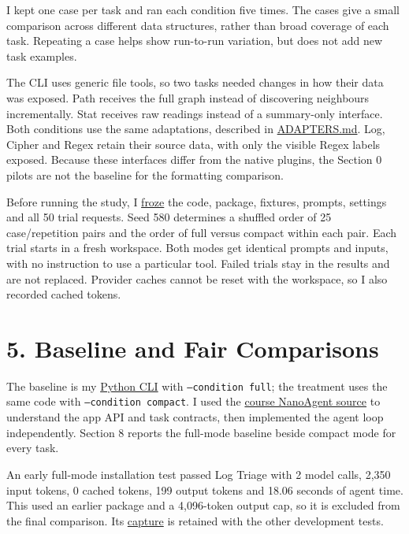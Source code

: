 \documentclass[10pt,letterpaper]{article}
\begin{document}
I kept one case per task and ran each condition five times. The cases give a small comparison across different data structures, rather than broad coverage of each task. Repeating a case helps show run-to-run variation, but does not add new task examples.

The CLI uses generic file tools, so two tasks needed changes in how their data was exposed. Path receives the full graph instead of discovering neighbours incrementally. Stat receives raw readings instead of a summary-only interface. Both conditions use the same adaptations, described in \href{https://github.com/a-little-hoof/580-final/blob/main/docs/ADAPTERS.md}{ADAPTERS.md}. Log, Cipher and Regex retain their source data, with only the visible Regex labels exposed. Because these interfaces differ from the native plugins, the Section 0 pilots are not the baseline for the formatting comparison.

Before running the study, I \href{https://github.com/a-little-hoof/580-final/blob/main/study/controlled/final/freeze.json}{froze} the code, package, fixtures, prompts, settings and all 50 trial requests. Seed 580 determines a shuffled order of 25 case/repetition pairs and the order of full versus compact within each pair. Each trial starts in a fresh workspace. Both modes get identical prompts and inputs, with no instruction to use a particular tool. Failed trials stay in the results and are not replaced. Provider caches cannot be reset with the workspace, so I also recorded cached tokens.

\section*{5. Baseline and Fair Comparisons}

The baseline is my \href{https://github.com/a-little-hoof/580-final/tree/main/src/comp580\_agent}{Python CLI} with \texttt{--condition full}; the treatment uses the same code with \texttt{--condition compact}. I used the \href{https://github.com/RUSH-LAB/nanoagent/tree/189454718dad10404b92147b52dc07b3e6a8e598}{course NanoAgent source} to understand the app API and task contracts, then implemented the agent loop independently. Section 8 reports the full-mode baseline beside compact mode for every task.

An early full-mode installation test passed Log Triage with 2 model calls, 2,350 input tokens, 0 cached tokens, 199 output tokens and 18.06 seconds of agent time. This used an earlier package and a 4,096-token output cap, so it is excluded from the final comparison. Its \href{https://github.com/a-little-hoof/580-final/blob/main/study/controlled/development/smoke-terminal-full/capture.json}{capture} is retained with the other development tests.
\end{document}
